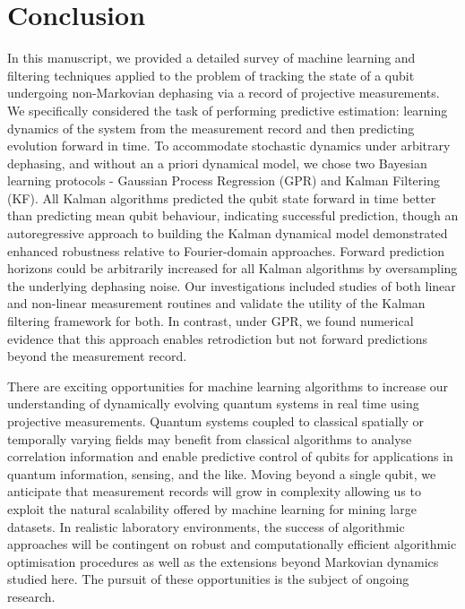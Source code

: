 \section{Conclusion \label{sec:main:Conclusion}}

In this manuscript, we provided a detailed survey of machine learning and filtering techniques applied to the problem of tracking the state of a qubit undergoing non-Markovian dephasing via a record of projective measurements.  We specifically considered the task of performing predictive estimation: learning dynamics of the system from the measurement record and then predicting evolution forward in time. To accommodate stochastic dynamics under arbitrary dephasing, and without an a priori dynamical model, we chose two Bayesian learning protocols - Gaussian Process Regression (GPR) and Kalman Filtering (KF).  All Kalman algorithms predicted the qubit state forward in time better than predicting mean qubit behaviour, indicating successful prediction, though an autoregressive approach to building the Kalman dynamical model demonstrated enhanced robustness relative to Fourier-domain approaches.  Forward prediction horizons could be arbitrarily increased for all Kalman algorithms by oversampling the underlying dephasing noise.  Our investigations included studies of both linear and non-linear measurement routines and validate the utility of the Kalman filtering framework for both.  In contrast, under GPR, we found numerical evidence that this approach enables retrodiction but not forward predictions beyond the measurement record.  

There are exciting opportunities for machine learning algorithms to increase our understanding of dynamically evolving quantum systems in real time using projective measurements. Quantum systems coupled to classical spatially or temporally varying fields may benefit from classical algorithms to analyse correlation information and enable predictive control of qubits for applications in quantum information, sensing, and the like. Moving beyond a single qubit, we anticipate that measurement records will grow in complexity allowing us to exploit the natural scalability offered by machine learning for mining large datasets. In realistic laboratory environments, the success of algorithmic approaches will be contingent on robust and computationally efficient algorithmic optimisation procedures as well as the extensions beyond Markovian dynamics studied here. The pursuit of these opportunities is the subject of ongoing research.

